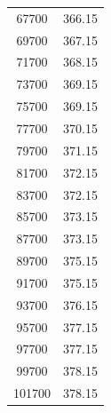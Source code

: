 \begin{longtable}{S S}
         67700  &   366.15 \\
         69700  &   367.15 \\
         71700  &   368.15 \\
         73700  &   369.15 \\
         75700  &   369.15 \\
         77700  &   370.15 \\
         79700  &   371.15 \\
         81700  &   372.15 \\
         83700  &   372.15 \\
         85700  &   373.15 \\
         87700  &   373.15 \\
         89700  &   375.15 \\
         91700  &   375.15 \\
         93700  &   376.15 \\
         95700  &   377.15 \\
         97700  &   377.15 \\
         99700  &   378.15 \\
         101700 &   378.15 \\
      \bottomrule
\end{longtable}

